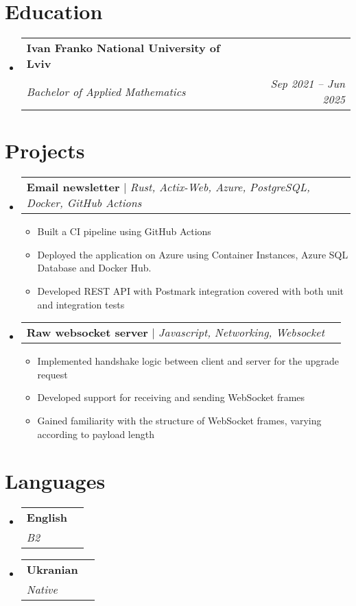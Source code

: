 \documentclass[letterpaper,11pt]{article}
\makeatletter
\newcommand{\resumeItem}[1]{
  \item\small{
    {#1 \vspace{-2pt}}
  }
}
\newcommand{\resumeSubheading}[4]{
  \vspace{-2pt}\item
    \begin{tabular*}{0.97\textwidth}[t]{l@{\extracolsep{\fill}}r}
      \textbf{#1} & #2 \\
      \textit{\small#3} & \textit{\small #4} \\
    \end{tabular*}\vspace{-7pt}
}
\newcommand{\resumeSubHeadingListStart}{\begin{itemize}[leftmargin=0.15in, label={}]}
\newcommand{\resumeSubHeadingListEnd}{\end{itemize}}
\newcommand{\resumeItemListStart}{\begin{itemize}}
\newcommand{\resumeItemListEnd}{\end{itemize}\vspace{-5pt}}
\newcommand{\resumeProjectHeading}[2]{
    \item
    \begin{tabular*}{0.97\textwidth}{l@{\extracolsep{\fill}}r}
      \small#1 & #2 \\
    \end{tabular*}\vspace{5pt}  %
}
\makeatother
\begin{document}
\section{Education}
  \resumeSubHeadingListStart
    \resumeSubheading
      {Ivan Franko National University of Lviv}{}
      {Bachelor of Applied Mathematics} {Sep 2021 -- Jun 2025}
  \resumeSubHeadingListEnd

\section{Projects}
    \resumeSubHeadingListStart
      \resumeProjectHeading
          {\textbf{Email newsletter} $|$ \emph{Rust, Actix-Web, Azure, PostgreSQL, Docker, GitHub Actions}}{}
          \resumeItemListStart
            \resumeItem{Built a CI pipeline using GitHub Actions}
            \resumeItem{Deployed the application on Azure using Container Instances, Azure SQL Database and Docker Hub.}
            \resumeItem{Developed REST API with Postmark integration covered with both unit and integration tests}
          \resumeItemListEnd
      \resumeProjectHeading
          {\textbf{Raw websocket server} $|$ \emph{Javascript, Networking, Websocket}}{}
          \resumeItemListStart
            \resumeItem{Implemented handshake logic between client and server for the upgrade request}
            \resumeItem{Developed support for receiving and sending WebSocket frames}
            \resumeItem{Gained familiarity with the structure of WebSocket frames, varying according to payload length}
          \resumeItemListEnd
    \resumeSubHeadingListEnd
    
\section{Languages}
  \resumeSubHeadingListStart
    \resumeSubheading
      {English}{}
      {B2} {}
    \resumeSubheading
      {Ukranian}{}
      {Native} {}
  \resumeSubHeadingListEnd
  
\end{document}
